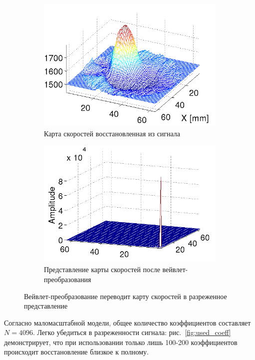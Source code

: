 \documentclass[14pt]{matmex-diploma}
\begin{document}
\begin{figure}[h]

\begin{subfigure}{.5\textwidth}
    \centering
    \includegraphics[width=0.8\linewidth]{pics/speed_map.png}
    \caption{Карта скоростей восстановленная из сигнала}
    \label{fig:speedmap}
\end{subfigure}
\begin{subfigure}{.5\textwidth}
    \centering
    \includegraphics[width=0.8\linewidth]{pics/freq_domain.png}
    \caption{Представление карты скоростей после вейвлет-преобразования}
    \label{fig:waveletted}
\end{subfigure}
	\caption{Вейвлет-преобразование переводит карту скоростей в разреженное представление}
	\label{fig:wavelet_transform}
\end{figure}

Согласно маломасштабной модели, общее количество коэффициентов составляет $N = 4096$.  Легко убедиться в разреженности сигнала: рис.~\ref{fig:used_coeff} демонстрирует, что при использовании только лишь 100-200 коэффициентов происходит восстановление близкое к полному. \\
\end{document}
